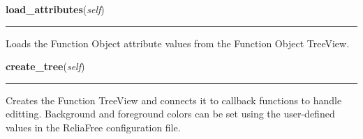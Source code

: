     \label{reliafree:function:Function:load_attributes}

    \vspace{0.5ex}

\hspace{.8\funcindent}\begin{boxedminipage}{\funcwidth}

    \raggedright \textbf{load\_attributes}(\textit{self})

    \vspace{-1.5ex}

    \rule{\textwidth}{0.5\fboxrule}
\setlength{\parskip}{2ex}
    Loads the Function Object attribute values from the Function Object 
    TreeView.

\setlength{\parskip}{1ex}
    \end{boxedminipage}

    \label{reliafree:function:Function:create_tree}

    \vspace{0.5ex}

\hspace{.8\funcindent}\begin{boxedminipage}{\funcwidth}

    \raggedright \textbf{create\_tree}(\textit{self})

    \vspace{-1.5ex}

    \rule{\textwidth}{0.5\fboxrule}
\setlength{\parskip}{2ex}
    Creates the Function TreeView and connects it to callback functions to 
    handle editting.  Background and foreground colors can be set using the
    user-defined values in the ReliaFree configuration file.

\setlength{\parskip}{1ex}
    \end{boxedminipage}

    \label{reliafree:function:Function:load_tree}

    \vspace{0.5ex}

